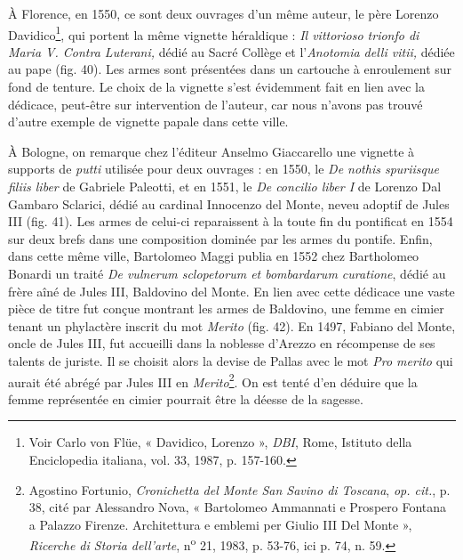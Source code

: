\documentclass[12pt,twoside,openany]{book}
\begin{document}
À Florence, en 1550, ce sont deux ouvrages d’un même auteur, le père Lorenzo Davidico\footnote{Voir Carlo von Flüe, « Davidico, Lorenzo », \textit{DBI}, Rome, Istituto della Enciclopedia italiana, vol. 33, 1987, p. 157-160.}, qui portent la même vignette héraldique : \textit{Il vittorioso trionfo di Maria V. Contra Luterani, }dédié au Sacré Collège et l’\textit{Anotomia delli vitii, }dédiée au pape (fig. 40). Les armes sont présentées dans un cartouche à enroulement sur fond de tenture. Le choix de la vignette s’est évidemment fait en lien avec la dédicace, peut-être sur intervention de l’auteur, car nous n’avons pas trouvé d’autre exemple de vignette papale dans cette ville.

À Bologne, on remarque chez l’éditeur Anselmo Giaccarello une vignette à supports de \textit{putti} utilisée pour deux ouvrages : en 1550, le \textit{De nothis spuriisque filiis liber }de Gabriele Paleotti, et en 1551, le \textit{De concilio liber I} de Lorenzo Dal Gambaro Sclarici, dédié au cardinal Innocenzo del Monte, neveu adoptif de Jules III (fig. 41). Les armes de celui-ci reparaissent à la toute fin du pontificat en 1554 sur deux brefs dans une composition dominée par les armes du pontife. Enfin, dans cette même ville, Bartolomeo Maggi publia en 1552 chez Bartholomeo Bonardi un traité \textit{De vulnerum sclopetorum et bombardarum curatione}, dédié au frère aîné de Jules III, Baldovino del Monte. En lien avec cette dédicace une vaste pièce de titre fut conçue montrant les armes de Baldovino, une femme en cimier tenant un phylactère inscrit du mot \textit{Merito} (fig. 42). En 1497, Fabiano del Monte, oncle de Jules III, fut accueilli dans la noblesse d’Arezzo en récompense de ses talents de juriste. Il se choisit alors la devise de Pallas avec le mot \textit{Pro merito} qui aurait été abrégé par Jules III en \textit{Merito}\footnote{Agostino Fortunio, \textit{Cronichetta del Monte San Savino di Toscana},\textit{ op. cit.}, p. 38, cité par Alessandro Nova, « Bartolomeo Ammannati e Prospero Fontana a Palazzo Firenze. Architettura e emblemi per Giulio III Del Monte », \textit{Ricerche di Storia dell’arte}, n\textsuperscript{o} 21, 1983, p. 53-76, ici p. 74, n. 59.}. On est tenté d’en déduire que la femme représentée en cimier pourrait être la déesse de la sagesse.
\end{document}

